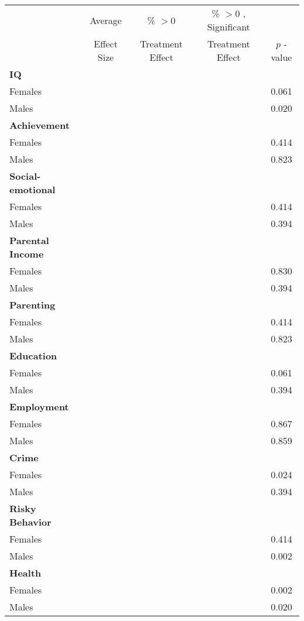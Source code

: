\begin{tabular}{l c c c c}
\toprule
 & Average & \% $ >0 $ & \% $ >0 $ , Significant & \citet{Rosenbaum_2005_Distribution_JRSS} \\
 & Effect Size & Treatment Effect & Treatment Effect & $ p $ -value \\
\midrule
\textbf{IQ} & & & & \\
\quad Females &   &  &  &     0.061 \\
\quad Males &   &  &  &     0.020 \\
\midrule
\textbf{Achievement} & & & & \\
\quad Females &   &  &  &     0.414 \\
\quad Males &   &  &  &     0.823 \\
\midrule
\textbf{Social-emotional} & & & & \\
\quad Females &   &  &  &     0.414 \\
\quad Males &   &  &  &     0.394 \\
\midrule
\textbf{Parental Income} & & & & \\
\quad Females &   &  &  &     0.830 \\
\quad Males &   &  &  &     0.394 \\
\midrule
\textbf{Parenting} & & & & \\
\quad Females &   &  &  &     0.414 \\
\quad Males &   &  &  &     0.823 \\
\midrule
\textbf{Education} & & & & \\
\quad Females &   &  &  &     0.061 \\
\quad Males &   &  &  &     0.394 \\
\midrule
\textbf{Employment} & & & & \\
\quad Females &   &  &  &     0.867 \\
\quad Males &   &  &  &     0.859 \\
\midrule
\textbf{Crime} & & & & \\
\quad Females &   &  &  &     0.024 \\
\quad Males &   &  &  &     0.394 \\
\midrule
\textbf{Risky Behavior} & & & & \\
\quad Females &   &  &  &     0.414 \\
\quad Males &   &  &  &     0.002 \\
\midrule
\textbf{Health} & & & & \\
\quad Females &   &  &  &     0.002 \\
\quad Males &   &  &  &     0.020 \\
\bottomrule
\end{tabular}
